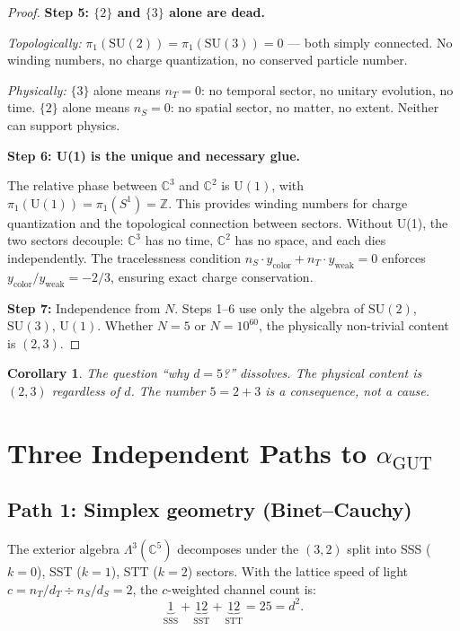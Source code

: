 \documentclass[12pt]{article}
\newtheorem{corollary}[theorem]{Corollary}
\theoremstyle{remark}
\begin{document}
{\begin{proof}
\textbf{Step 5: $\{2\}$ and $\{3\}$ alone are dead.}

\emph{Topologically:} $\pi_1(\text{SU}(2)) = \pi_1(\text{SU}(3)) = 0$ --- both simply connected. No winding numbers, no charge quantization, no conserved particle number.

\emph{Physically:} $\{3\}$ alone means $n_T = 0$: no temporal sector, no unitary evolution, no time. $\{2\}$ alone means $n_S = 0$: no spatial sector, no matter, no extent. Neither can support physics.

\textbf{Step 6: U(1) is the unique and necessary glue.}

The relative phase between $\mathbb{C}^3$ and $\mathbb{C}^2$ is $\text{U}(1)$, with $\pi_1(\text{U}(1)) = \pi_1(S^1) = \mathbb{Z}$. This provides winding numbers for charge quantization and the topological connection between sectors. Without U(1), the two sectors decouple: $\mathbb{C}^3$ has no time, $\mathbb{C}^2$ has no space, and each dies independently. The tracelessness condition $n_S \cdot y_\text{color} + n_T \cdot y_\text{weak} = 0$ enforces $y_\text{color}/y_\text{weak} = -2/3$, ensuring exact charge conservation.

\textbf{Step 7:} Independence from $N$. Steps 1--6 use only the algebra of $\text{SU}(2)$, $\text{SU}(3)$, $\text{U}(1)$. Whether $N = 5$ or $N = 10^{60}$, the physically non-trivial content is $(2, 3)$.
\end{proof}

\begin{corollary}
The question ``why $d = 5$?'' dissolves. The physical content is $(2, 3)$ regardless of $d$. The number $5 = 2 + 3$ is a consequence, not a cause.
\end{corollary}

\section{Three Independent Paths to $\alpha_\text{GUT}$}

\subsection{Path 1: Simplex geometry (Binet--Cauchy)}

The exterior algebra $\Lambda^3(\mathbb{C}^5)$ decomposes under the $(3,2)$ split into SSS ($k=0$), SST ($k=1$), STT ($k=2$) sectors. With the lattice speed of light $c = n_T/d_T \div n_S/d_S = 2$, the $c$-weighted channel count is:
\begin{equation}
\underbrace{1}_{\text{SSS}} + \underbrace{12}_{\text{SST}} + \underbrace{12}_{\text{STT}} = 25 = d^2.
\end{equation}

}
\end{document}
